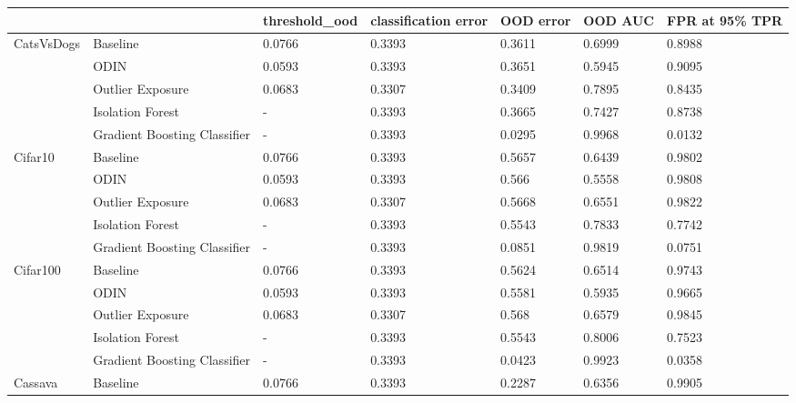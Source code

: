 \begin{tabular}{lllllll}
\toprule
            &                              & threshold\_ood & classification error & OOD error & OOD AUC & FPR at 95\% TPR \\
\midrule
CatsVsDogs & Baseline &        0.0766 &               0.3393 &    0.3611 &  0.6999 &         0.8988 \\
            & ODIN &        0.0593 &               0.3393 &    0.3651 &  0.5945 &         0.9095 \\
            & Outlier Exposure &        0.0683 &               0.3307 &    0.3409 &  0.7895 &         0.8435 \\
            & Isolation Forest &             - &               0.3393 &    0.3665 &  0.7427 &         0.8738 \\
            & Gradient Boosting Classifier &             - &               0.3393 &    0.0295 &  0.9968 &         0.0132 \\
Cifar10 & Baseline &        0.0766 &               0.3393 &    0.5657 &  0.6439 &         0.9802 \\
            & ODIN &        0.0593 &               0.3393 &     0.566 &  0.5558 &         0.9808 \\
            & Outlier Exposure &        0.0683 &               0.3307 &    0.5668 &  0.6551 &         0.9822 \\
            & Isolation Forest &             - &               0.3393 &    0.5543 &  0.7833 &         0.7742 \\
            & Gradient Boosting Classifier &             - &               0.3393 &    0.0851 &  0.9819 &         0.0751 \\
Cifar100 & Baseline &        0.0766 &               0.3393 &    0.5624 &  0.6514 &         0.9743 \\
            & ODIN &        0.0593 &               0.3393 &    0.5581 &  0.5935 &         0.9665 \\
            & Outlier Exposure &        0.0683 &               0.3307 &     0.568 &  0.6579 &         0.9845 \\
            & Isolation Forest &             - &               0.3393 &    0.5543 &  0.8006 &         0.7523 \\
            & Gradient Boosting Classifier &             - &               0.3393 &    0.0423 &  0.9923 &         0.0358 \\
Cassava & Baseline &        0.0766 &               0.3393 &    0.2287 &  0.6356 &         0.9905 \\

\end{tabular}
